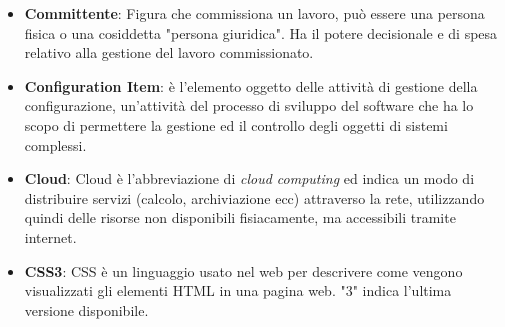 \documentclass[a4paper, oneside, openany]{article}
\begin{document}
\begin{itemize}
\item \textbf{Committente}: Figura che commissiona un lavoro, può essere una persona fisica o una cosiddetta "persona giuridica". Ha il potere decisionale e di spesa relativo alla gestione del lavoro commissionato.
\item \textbf{Configuration Item}: è l'elemento oggetto delle attività di gestione della configurazione, un'attività del processo di sviluppo del software che ha lo scopo di permettere la gestione ed il controllo degli oggetti di sistemi complessi.
\item \textbf{Cloud}: Cloud è l'abbreviazione di \textit{cloud computing} ed indica un modo di distribuire servizi (calcolo, archiviazione ecc) attraverso la rete, utilizzando quindi delle risorse non disponibili fisiacamente, ma accessibili tramite internet.
\item \textbf{CSS3}: CSS è un linguaggio usato nel web per descrivere come vengono visualizzati gli elementi HTML in una pagina web. "3" indica l'ultima versione disponibile.
\end{itemize}
\end{document}
